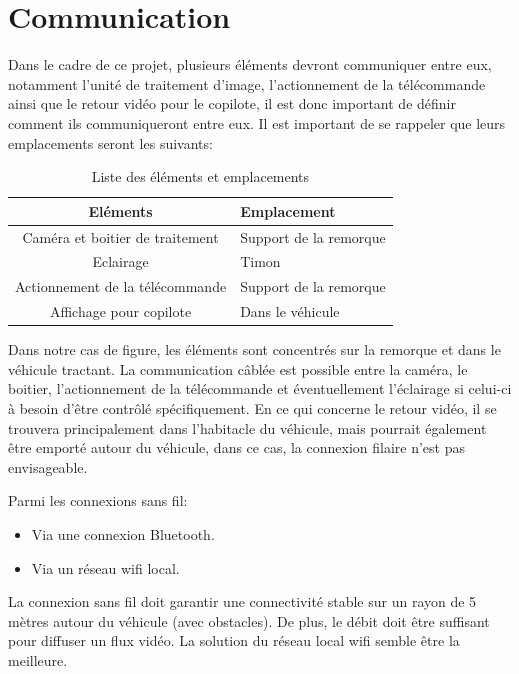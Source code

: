 \section{Communication}
Dans le cadre de ce projet, plusieurs éléments devront communiquer entre eux, notamment l'unité de traitement d'image,
l'actionnement de la télécommande ainsi que le retour vidéo pour le copilote, il est donc important de définir comment ils communiqueront entre eux.
Il est important de se rappeler que leurs emplacements seront les suivants:

\begin{table}[h]
    \begin{center}
        \caption{Liste des éléments et emplacements}
        \begin{tabular}{|c|l|}
            Eléments                        & Emplacement            \\ \hline
            Caméra et boitier de traitement & Support de la remorque \\
            Eclairage                       & Timon                  \\
            Actionnement de la télécommande & Support de la remorque \\
            Affichage pour copilote         & Dans le véhicule
        \end{tabular}
    \end{center}
\end{table}

Dans notre cas de figure, les éléments sont concentrés sur la remorque et dans le véhicule tractant. La communication câblée est possible
entre la caméra, le boitier, l'actionnement de la télécommande et éventuellement l'éclairage si celui-ci à besoin d'être contrôlé spécifiquement.
En ce qui concerne le retour vidéo, il se trouvera principalement dans l'habitacle du véhicule, mais pourrait également être emporté autour du véhicule,
dans ce cas, la connexion filaire n'est pas envisageable.

Parmi les connexions sans fil:
\begin{itemize}
    \item Via une connexion Bluetooth.
    \item Via un réseau \Gls{wifi} local.
\end{itemize}
La connexion sans fil doit garantir une connectivité stable sur un rayon de 5 mètres autour du véhicule (avec obstacles). De plus, le débit doit être
suffisant pour diffuser un flux vidéo. La solution du réseau local \Gls{wifi} semble être la meilleure.

